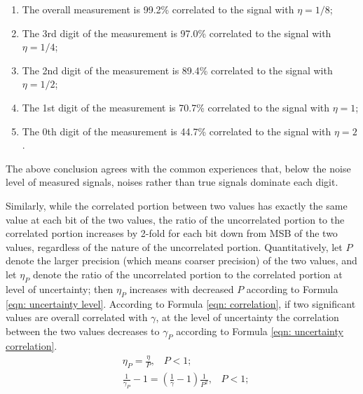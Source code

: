 \documentclass[twoside]{article}
\numberwithin{equation}{section}
\newcommand{\eqspace}{\;\;\;}
\begin{document}
\begin{enumerate}
\item  The overall measurement is 99.2\% correlated to the signal with $\eta=1/8$;
\item  The 3rd digit of the measurement is 97.0\% correlated to the signal with $\eta=1/4$;
\item  The 2nd digit of the measurement is 89.4\% correlated to the signal with $\eta=1/2$;
\item  The 1st digit of the measurement is 70.7\% correlated to the signal with $\eta=1$;
\item  The 0th digit of the measurement is 44.7\% correlated to the signal with $\eta=2$.
\end{enumerate}
The above conclusion agrees with the common experiences that, below the noise level of measured signals, noises rather than true signals dominate each digit.  

Similarly, while the correlated portion between two values has exactly the same value at each bit of the two values, the ratio of the uncorrelated portion to the correlated portion increases by 2-fold for each bit down from MSB of the two values, regardless of the nature of the uncorrelated portion.  
Quantitatively, let $P$ denote the larger precision (which means coarser precision) of the two values, and let $\eta_{P}$ denote the ratio of the uncorrelated portion to the correlated portion at level of uncertainty; then $\eta_{P}$ increases with decreased $P$ according to Formula \eqref{eqn: uncertainty level}. 
According to Formula \eqref{eqn: correlation}, if two significant values are overall correlated with $\gamma$, at the level of uncertainty the correlation between the two values decreases to $\gamma_P$ according to Formula \eqref{eqn: uncertainty correlation}.
\begin{align}
\label{eqn: uncertainty level}
& \eta_{P} = \frac{\eta}{P}, \eqspace P < 1; \\
\label{eqn: uncertainty correlation}
& \frac{1}{\gamma_{P}} - 1 = \left(\frac{1}{\gamma} -1\right) \frac{1}{P^2}, \eqspace P < 1;
\end{align}
\end{document}
